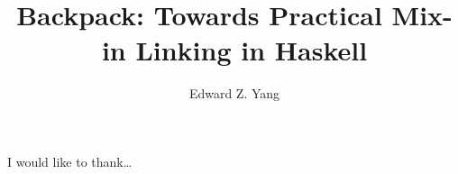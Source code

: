 \documentclass{report}
\begin{document}
\title{Backpack: Towards Practical Mix-in Linking in Haskell}
\author{Edward Z. Yang}

\beforepreface%
    I would like to thank\ldots
\afterpreface%












%



\end{document}
